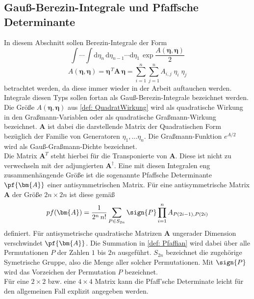 \newpage

\subsection{Gauß-Berezin-Integrale und Pfaffsche Determinante}

In diesem Abschnitt sollen Berezin-Integrale der Form 
\begin{equation} \label{def: Gaussintegral}
\int \cdots \int \mathrm{d}\eta_n\,\mathrm{d}\eta_{n-1}\cdots \mathrm{d}\eta_1\, \exp{\frac{A\left(\bm{\eta}, \bm{\eta}\right)}{2}}
\end{equation}
\begin{equation} \label{def: QuadratWirkung}
A\left(\bm{\eta}, \bm{\eta}\right) = \bm{\eta}^{\,T} \bm{A}\, \bm{\eta} = \sum_{i=1}^n \sum_{j=1}^n A_{i,j}\; \eta_i\; \eta_j 
\end{equation}
betrachtet werden, da diese immer wieder in der Arbeit auftauchen werden. Integrale diesen Typs sollen fortan als Gauß-Berezin-Integrale bezeichnet werden. Die Größe $A\left(\bm{\eta}, \bm{\eta}\right)$ aus \eqref{def: QuadratWirkung} wird als quadratische Wirkung in den Graßmann-Variablen oder als quadratische Graßmann-Wirkung bezeichnet. $\bm{A}$ ist dabei die darstellende Matrix der Quadratischen Form bezüglich der Familie von Generatoren $\eta_1, ... \eta_n$. Die Graßmann-Funktion $e^{A/2}$ wird als Gauß-Graßmann-Dichte bezeichnet.\\
Die Matrix $\bm{A}^T$ steht hierbei für die Transponierte von $\bm{A}$. Diese ist nicht zu verwechseln mit der adjungierten $\bm{A}^\dagger$. Eine mit diesen Integralen eng zusammenhängende Größe ist die sogenannte Pfaffsche Determinante $\pf{\bm{A}}$ einer antisymmetrischen Matrix. Für eine antisymmetrische Matrix $\bm{A}$ der Größe $2n \times 2n$ ist diese gemäß 
\begin{equation} \label{def: Pfaffian}
pf(\bm{A}) = \frac{1}{2^n\,n!} \sum_{P \in S_{2n}} \sign{P} \prod_{i=1}^n A_{P(2i-1),P(2i)} 
\end{equation}
definiert. Für antisymetrische quadratische Matrizen $\bm{A}$ ungerader Dimension verschwindet $\pf{\bm{A}}$. Die Summation in \eqref{def: Pfaffian} wird dabei über alle Permutationen $P$ der Zahlen $1$ bis $2n$ ausgeführt. $S_{2n}$ bezeichnet die zugehörige Symetrische Gruppe, also die Menge aller solcher Permutationen. Mit $\sign{P}$ wird das Vorzeichen der Permutation $P$ bezeichnet. \\
Für eine $2\times2$ bzw. eine $4\times4$ Matrix kann die Pfaff'sche Determinate leicht für den allgemeinen Fall explizit angegeben werden.

